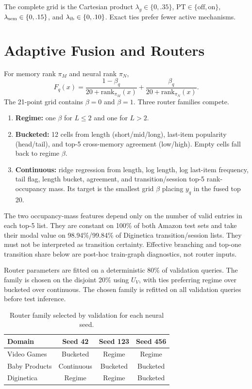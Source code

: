 \documentclass[runningheads]{llncs}
\begin{document}
The complete grid is the Cartesian product
$\lambda_g\in\{0,.35\}$,
PT$\in\{\mathrm{off},\mathrm{on}\}$,
$\lambda_{\rm sem}\in\{0,.15\}$, and
$\lambda_{\rm ib}\in\{0,.10\}$. Exact ties prefer fewer active mechanisms.

\section{Adaptive Fusion and Routers}
For memory rank $\pi_M$ and neural rank $\pi_N$,
\[
F_q(x)=
\frac{1-\beta_q}{20+\mathrm{rank}_{\pi_M}(x)}
+\frac{\beta_q}{20+\mathrm{rank}_{\pi_N}(x)}.
\]
The 21-point grid contains $\beta=0$ and $\beta=1$. Three router families
compete.

\begin{enumerate}
\item \textbf{Regime:} one $\beta$ for $L\leq2$ and one for $L>2$.
\item \textbf{Bucketed:} 12 cells from length
      (short/mid/long), last-item popularity (head/tail), and top-5
      cross-memory agreement (low/high). Empty cells fall back to regime
      $\beta$.
\item \textbf{Continuous:} ridge regression from length, log length,
      log last-item frequency, tail flag, length bucket, agreement, and
      transition/session top-5 rank-occupancy mass. Its target is the smallest
      grid $\beta$ placing $y_q$ in the fused top 20.
\end{enumerate}

The two occupancy-mass features depend only on the number of valid entries in
each top-5 list. They are constant on 100\% of both Amazon test sets and take
their modal value on 98.94\%/99.84\% of Diginetica
transition/session lists. They must not be interpreted as transition
certainty. Effective branching and top-one transition share below are
post-hoc train-graph diagnostics, not router inputs.

Router parameters are fitted on a deterministic 80\% of validation queries.
The family is chosen on the disjoint 20\% using $U_V$, with ties preferring
regime over bucketed over continuous. The chosen family is refitted on all
validation queries before test inference.

\begin{table}[t]
\caption{Router family selected by validation for each neural seed.}
\centering
\begin{tabular}{lccc}
\toprule
Domain & Seed 42 & Seed 123 & Seed 456\\
\midrule
Video Games & Bucketed & Regime & Regime\\
Baby Products & Continuous & Bucketed & Bucketed\\
Diginetica & Regime & Regime & Bucketed\\
\bottomrule
\end{tabular}
\end{table}
\end{document}
